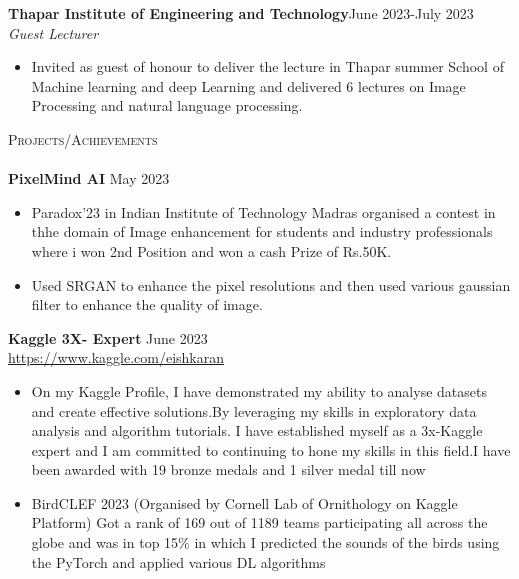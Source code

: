 \documentclass[a4paper]{article}
\newcommand{\lineunder} {
    \vspace*{-8pt} \\
    \hspace*{-18pt} \hrulefill \\
}
\newcommand{\header} [1] {
    {\hspace*{-18pt}\vspace*{6pt} \textsc{#1}}
    \vspace*{-6pt} \lineunder
}
\begin{document}
{\textbf{Thapar Institute of Engineering and Technology}}\hfill June 2023-July 2023 \\
 {\textit{Guest Lecturer}}  \
\vspace{-2.5mm}
\begin{itemize} 
\item Invited as guest of  honour to deliver the lecture in Thapar summer School of Machine learning and deep Learning and delivered 6 lectures on Image Processing and natural language processing.
\end{itemize}
\vspace{-2mm}
\header{Projects/Achievements}
{\textbf{PixelMind AI}} \hfill May 2023 \\
\vspace{-3mm}
\begin{itemize} 
	\item Paradox’23 in Indian Institute of Technology Madras organised a contest in thhe domain of Image enhancement for students and industry professionals where i won 2nd Position and won a cash Prize of Rs.50K.
    \vspace{-2mm}
    \item Used SRGAN to enhance the pixel resolutions and then used various gaussian filter to enhance the quality of image.
\end{itemize}
\vspace{-2.5 mm}
{\textbf{Kaggle 3X- Expert}} \hfill June 2023 \\
\vspace{-0.5mm}
\url{https://www.kaggle.com/eishkaran} \\
\vspace{-2.5mm}
\begin{itemize} 
	\item On my Kaggle Profile, I have demonstrated my ability to analyse datasets and create effective solutions.By leveraging my skills in exploratory data analysis and algorithm tutorials. I have established myself as a 3x-Kaggle expert and I am committed to continuing to hone my skills in this field.I have been awarded with 19 bronze medals and 1 silver medal till now
    \vspace{-3.0 mm}
    \item BirdCLEF 2023 (Organised by Cornell Lab of Ornithology on Kaggle Platform) Got a rank of 169 out of 1189 teams participating all across the globe and was in top 15\%  in which I predicted the sounds of the birds using the PyTorch and applied various DL algorithms 
\vspace{-2.5 mm}
\end{itemize}
\end{document}
